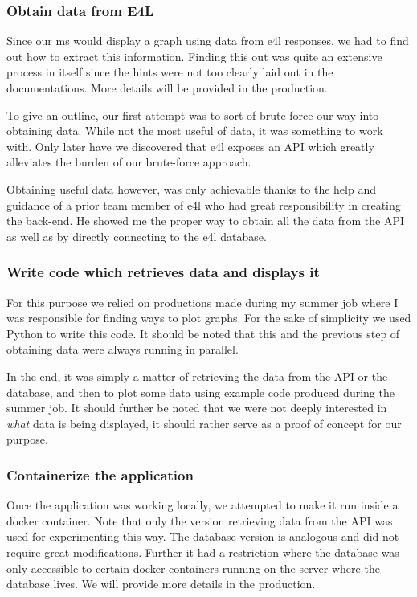\subsubsection{Obtain data from E4L}

Since our \gls{ms} would display a graph using data from \gls{e4l}
responses, we had to find out how to extract this information. Finding
this out was quite an extensive process in itself since the hints were
not too clearly laid out in the documentations. More details will be
provided in the production.

To give an outline, our first attempt was to sort of brute-force our
way into obtaining data. While not the most useful of data, it was
something to work with. Only later have we discovered that \gls{e4l}
exposes an API which greatly alleviates the burden of our brute-force
approach.

Obtaining useful data however, was only achievable thanks to the help
and guidance of a prior team member of \gls{e4l} who had great
responsibility in creating the back-end. He showed me the proper way to
obtain all the data from the API as well as by directly connecting to
the \gls{e4l} database.

\subsubsection{Write code which retrieves data and displays it}

For this purpose we relied on productions made during my summer job
where I was responsible for finding ways to plot graphs. For the sake
of simplicity we used Python to write this code. It should be noted
that this and the previous step of obtaining data were always running
in parallel.

In the end, it was simply a matter of retrieving the data from the API
or the database, and then to plot some data using example code
produced during the summer job. It should further be noted that we
were not deeply interested in \textit{what} data is being displayed, it should
rather serve as a proof of concept for our purpose.

\subsubsection{Containerize the application}

Once the application was working locally, we attempted to make it run
inside a docker container. Note that only the version retrieving data
from the API was used for experimenting this way. The database version
is analogous and did not require great modifications. Further it had a
restriction where the database was only accessible to certain docker
containers running on the server where the database lives. We will
provide more details in the production.

